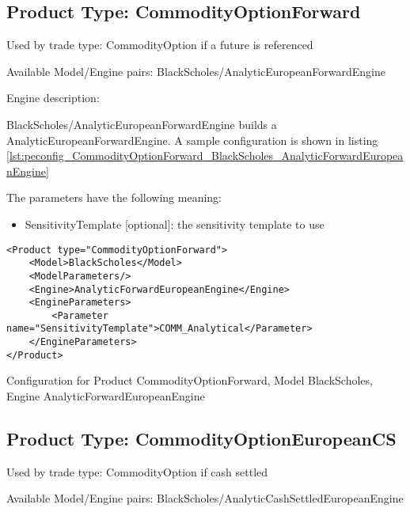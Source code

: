 \subsection{Product Type: CommodityOptionForward}

Used by trade type: CommodityOption if a future is referenced

Available Model/Engine pairs: BlackScholes/AnalyticEuropeanForwardEngine

Engine description:

BlackScholes/AnalyticEuropeanForwardEngine builds a AnalyticEuropeanForwardEngine. A sample configuration is shown in listing
\ref{lst:peconfig_CommodityOptionForward_BlackScholes_AnalyticForwardEuropeanEngine}

The parameters have the following meaning:

\begin{itemize}
\item SensitivityTemplate [optional]: the sensitivity template to use 
\end{itemize}

\begin{longlisting}
\begin{verbatim}
<Product type="CommodityOptionForward">
    <Model>BlackScholes</Model>
    <ModelParameters/>
    <Engine>AnalyticForwardEuropeanEngine</Engine>
    <EngineParameters>
        <Parameter name="SensitivityTemplate">COMM_Analytical</Parameter>
    </EngineParameters>
</Product>
\end{verbatim}
\caption{Configuration for Product CommodityOptionForward, Model BlackScholes, Engine AnalyticForwardEuropeanEngine}
\label{lst:peconfig_CommodityOptionForward_BlackScholes_AnalyticForwardEuropeanEngine}
\end{longlisting}

\subsection{Product Type: CommodityOptionEuropeanCS}

Used by trade type: CommodityOption if cash settled

Available Model/Engine pairs: BlackScholes/AnalyticCashSettledEuropeanEngine

